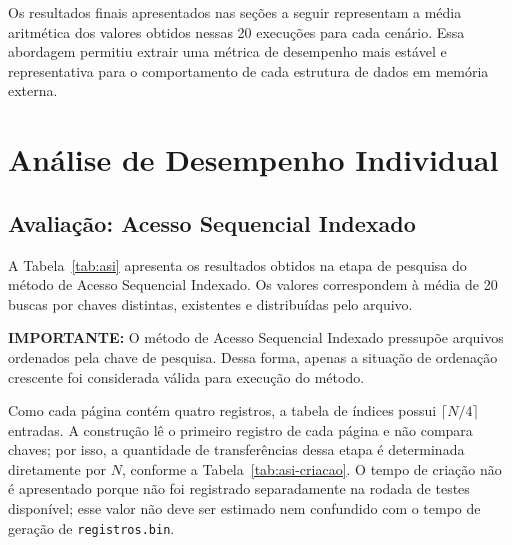 \documentclass[12pt,a4paper]{article}
\begin{document}
Os resultados finais apresentados nas seções a seguir representam a média aritmética dos valores obtidos nessas 20 execuções para cada cenário. Essa abordagem permitiu extrair uma métrica de desempenho mais estável e representativa para o comportamento de cada estrutura de dados em memória externa.

\section{Análise de Desempenho Individual}

\subsection{Avaliação: Acesso Sequencial Indexado}

A Tabela~\ref{tab:asi} apresenta os resultados obtidos na etapa de pesquisa do método
de Acesso Sequencial Indexado. Os valores correspondem à média de 20 buscas por chaves
distintas, existentes e distribuídas pelo arquivo.

\textbf{IMPORTANTE:} O método de Acesso Sequencial Indexado pressupõe arquivos ordenados pela chave de pesquisa. Dessa forma, apenas a situação de ordenação crescente foi considerada válida para execução do método.

Como cada página contém quatro registros, a tabela de índices possui
$\lceil N/4\rceil$ entradas. A construção lê o primeiro registro de cada página e não
compara chaves; por isso, a quantidade de transferências dessa etapa é determinada
diretamente por $N$, conforme a Tabela~\ref{tab:asi-criacao}. O tempo de criação não é
apresentado porque não foi registrado separadamente na rodada de testes disponível;
esse valor não deve ser estimado nem confundido com o tempo de geração de
\texttt{registros.bin}.

\begin{table}[H]
\centering
\caption{Operações realizadas na criação do índice do ASI}
\label{tab:asi-criacao}
\end{table}
\end{document}
